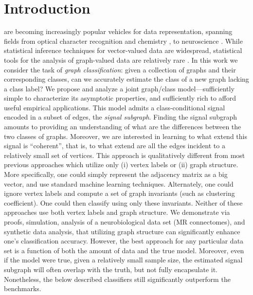 \documentclass[10pt,journal,cspaper,compsoc]{IEEEtran}
\begin{document}
\maketitle
\IEEEdisplaynotcompsoctitleabstractindextext
\IEEEpeerreviewmaketitle



\section{Introduction}

 are becoming increasingly popular vehicles for data representation, spanning fields from optical character recognition and chemistry \cite{Bunke2011}, to neuroscience \cite{Hagmann2010}.  While statistical inference techniques for vector-valued data are widespread, statistical tools for the analysis of graph-valued data are relatively rare \cite{Bunke2011}. In this work we consider the task of \emph{graph classification}: given a collection of graphs and their corresponding classes, can we accurately estimate the class of a new graph lacking a class label?  
We propose and analyze a joint graph/class model---sufficiently simple to characterize its asymptotic properties, and sufficiently rich to afford useful empirical applications.  This model admits a class-conditional signal encoded in a subset of edges, the \emph{signal subgraph}. Finding the signal subgraph amounts to providing an understanding of what are the differences between the two classes of graphs.  Moreover, we are interested in learning to what extend this signal is ``coherent'', that is, to what extend are all the edges incident to a relatively small set of vertices.  This approach is qualitatively different from most previous approaches which utilize only (i) vertex labels or (ii) graph structure.  More specifically, one could simply represent the adjacency matrix as a big vector, and use standard machine learning techniques.  Alternately, one could ignore vertex labels and compute a set of graph invariants (such as clustering coefficient). One could then classify using only these invariants.  Neither of these approaches use both vertex labels and graph structure.   We demonstrate via proofs, simulation, analysis of a neurobiological data set (MR connectomes), and synthetic data analysis, that utilizing graph structure can significantly enhance one's classification accuracy.  However, the best approach for any particular data set is a function of both the amount of data and the true model.  Moreover, even if the model were true, given a relatively small sample size, the estimated signal subgraph will often overlap with the truth, but not fully encapsulate it.  Nonetheless, the below described classifiers still significantly outperform the benchmarks.
\end{document}
